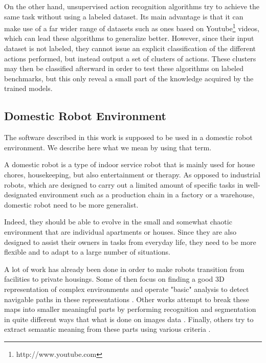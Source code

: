 On the other hand, unsupervised action recognition algorithms try to achieve the same task without using a labeled dataset. Its main advantage is that it can make use of a far wider range of datasets such as ones based on Youtube\footnote{http://www.youtube.com} videos, which can lead these algorithms to generalize better. However, since their input dataset is not labeled, they cannot issue an explicit classification of the different actions performed, but instead output a set of clusters of actions. These clusters may then be classified afterward in order to test these algorithms on labeled benchmarks, but this only reveal a small part of the knowledge acquired by the trained models.



\subsection{Domestic Robot Environment}
The software described in this work is supposed to be used in a domestic robot environment. We describe here what we mean by using that term.

A domestic robot is a type of indoor service robot that is mainly used for house chores, housekeeping, but also entertainment or therapy.
As opposed to industrial robots, which are designed to carry out a limited amount of specific tasks in well-designated environment such as a production chain in a factory or a warehouse, domestic robot need to be more generalist.

Indeed, they should be able to evolve in the small and somewhat chaotic environment that are individual apartments or houses. Since they are also designed to assist their owners in tasks from everyday life, they need to be more flexible and to adapt to a large number of situations.

A lot of work has already been done in order to make robots transition from facilities to private housings. Some of then focus on finding a good 3D representation of complex environments and operate "basic" analysis to detect navigable paths in these representations \cite{SLAM_review,loop-closure}. Other works attempt to break these maps into smaller meaningful parts by performing recognition and segmentation in quite different ways that what is done on images data \cite{plan_recognition,region_growing_seg, pointcloud_clustering}. Finally, others try to extract semantic meaning from these parts using various criteria \cite{action_map_first_person, semantic_pointcloud}.

